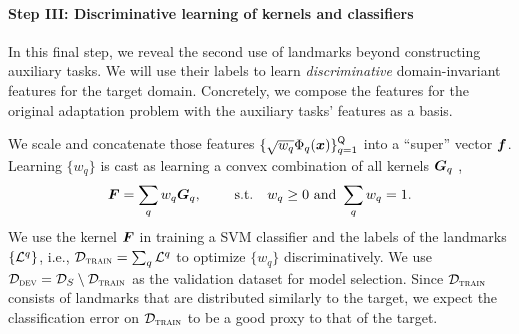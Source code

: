 \paragraph{\bf Step III: Discriminative learning of kernels and classifiers} \label{sMKL}

In this final step, we reveal the second use of landmarks beyond constructing auxiliary tasks. We will use their labels to learn  \emph{discriminative} domain-invariant features for the target domain. Concretely, we compose the features for the original adaptation problem with the auxiliary tasks' features as a basis.

We scale and concatenate those features $\{\sqrt{w_q}\Phi_q(\boldsymbol{x})\}_{q=1}^{\mathsf{Q}}$  into a ``super'' vector $\boldsymbol{f}$. Learning $\{w_q\}$ is cast as learning a convex combination of all kernels $\boldsymbol{G}_q$ \cite{lanckriet04kernel},
\begin{equation}
\mat{F} = \sum_q w_q \mat{G}_q,\qquad \  \mathrm{s.t.}\ \ \ w_q \ge 0\ \mbox{and}\ \sum_q w_q = 1.
\label{eMKL}
\end{equation}
We use the kernel $\boldsymbol{F}$ in training a SVM classifier and the labels of the landmarks $\{\mathcal{L}^q\}$, i.e., $\mathcal{D}_{\textsc{train}} = \sum_q \mathcal{L}^q$ to optimize $\{w_q\}$ discriminatively.  We use $\mathcal{D}_{\textsc{dev}} = \mathcal{D}_{S} \setminus \mathcal{D}_{\textsc{train}}$ as the validation dataset for model selection.  Since $\mathcal{D}_{\textsc{train}}$ consists of landmarks that are distributed similarly to the target, we expect the classification error on $\mathcal{D}_{\textsc{train}}$ to be a good proxy to that of the target.



